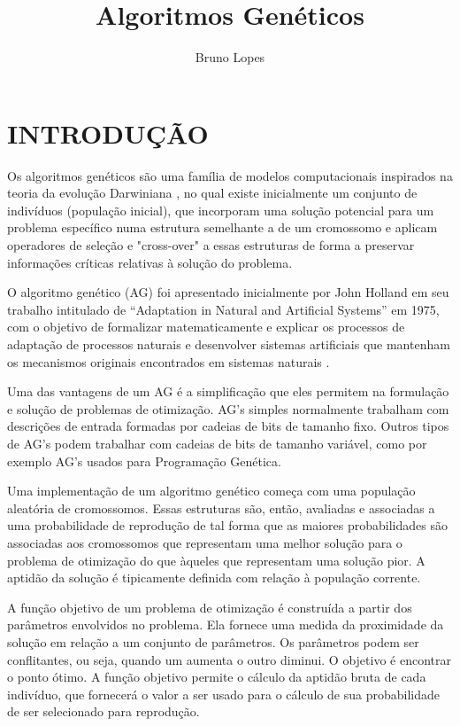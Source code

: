 \documentclass[conference]{IEEEtran}
\begin{document}
\title{Algoritmos Genéticos}

\author{Bruno Lopes}
\maketitle

\section{INTRODUÇÃO}
Os algoritmos genéticos \cite{b1} são uma família de modelos computacionais inspirados na teoria da evolução Darwiniana \cite{b2}, no qual existe inicialmente um conjunto de indivíduos (população inicial), que incorporam uma solução potencial para um problema específico numa estrutura semelhante a de um cromossomo e aplicam operadores de seleção e "cross-over" a essas estruturas de forma a preservar informações críticas relativas à solução do problema.
    
O algoritmo genético (AG) foi apresentado inicialmente por John Holland em seu trabalho intitulado de “Adaptation in Natural and Artificial Systems” em 1975, com o objetivo de  formalizar  matematicamente  e  explicar  os  processos  de  adaptação  de  processos  naturais e  desenvolver  sistemas  artificiais  que  mantenham  os  mecanismos  originais  encontrados  em sistemas naturais \cite{b3}. 

Uma das vantagens de um AG é a simplificação que eles permitem na formulação e solução de  problemas de otimização. AG's simples normalmente trabalham com descrições de entrada formadas por cadeias de bits de tamanho fixo. Outros tipos de AG's podem trabalhar com cadeias de bits de tamanho variável, como por exemplo AG's usados para Programação Genética. 

Uma implementação de um algoritmo genético começa com uma população aleatória de cromossomos. Essas estruturas são, então, avaliadas e associadas a uma probabilidade de reprodução de tal forma que as maiores probabilidades são associadas aos  cromossomos que representam uma melhor solução para o problema de otimização do que àqueles que representam uma solução pior. A aptidão da solução é tipicamente definida com relação à população corrente.

A função objetivo de um problema de otimização é construída a partir dos parâmetros envolvidos no problema. Ela fornece uma medida da proximidade da solução em relação a um conjunto de parâmetros. Os parâmetros podem ser conflitantes, ou seja, quando um aumenta o outro diminui. O objetivo é encontrar o ponto ótimo. A função objetivo permite o cálculo da aptidão bruta de cada indivíduo, que fornecerá o valor a ser  usado para o cálculo de sua probabilidade de ser selecionado para reprodução.
\end{document}
